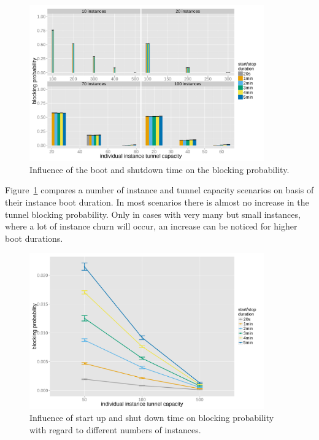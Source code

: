 \begin{figure}[htb]
	\centering
	\includegraphics[width=0.9\textwidth]{images/R-virtualized-startstop-blocking-barchart.pdf}
	\caption{Influence of the boot and shutdown time on the blocking probability.}
\label{c4:fig:blockprob-startstop-barchart}
\end{figure}

Figure~\ref{c4:fig:blockprob-startstop-barchart} compares a number of instance and tunnel capacity scenarios on basis of their instance boot duration. In most scenarios there is almost no increase in the tunnel blocking probability. Only in cases with very many but small instances, where a lot of instance churn will occur, an increase can be noticed for higher boot durations.

\begin{figure}[htb]
	\centering
	\includegraphics[width=0.9\textwidth]{images/compare-maxinstances-block.pdf}
	\caption{Influence of start up and shut down time on blocking probability with regard to different numbers of instances.}
\label{c4:fig:compare_maxinstances_block}
\end{figure}

